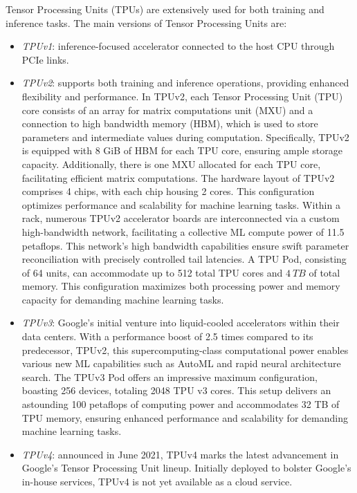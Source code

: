 Tensor Processing Units (TPUs) are extensively used for both training and inference tasks. 
The main versions of Tensor Processing Units are: 
\begin{itemize}
    \item \textit{TPUv1}: inference-focused accelerator connected to the host CPU through PCIe links. 
    \item \textit{TPUv2}: supports both training and inference operations, providing enhanced flexibility and performance.
        In TPUv2, each Tensor Processing Unit (TPU) core consists of an array for matrix computations unit (MXU) and a connection to high bandwidth memory (HBM), which is used to store parameters and intermediate values during computation.
        Specifically, TPUv2 is equipped with 8 GiB of HBM for each TPU core, ensuring ample storage capacity. 
        Additionally, there is one MXU allocated for each TPU core, facilitating efficient matrix computations.
        The hardware layout of TPUv2 comprises 4 chips, with each chip housing 2 cores. 
        This configuration optimizes performance and scalability for machine learning tasks.
        Within a rack, numerous TPUv2 accelerator boards are interconnected via a custom high-bandwidth network, facilitating a collective ML compute power of 11.5 petaflops. 
        This network's high bandwidth capabilities ensure swift parameter reconciliation with precisely controlled tail latencies.
        A TPU Pod, consisting of 64 units, can accommodate up to 512 total TPU cores and $4\:TB$ of total memory. 
        This configuration maximizes both processing power and memory capacity for demanding machine learning tasks.
    \item \textit{TPUv3}: Google's initial venture into liquid-cooled accelerators within their data centers. 
        With a performance boost of 2.5 times compared to its predecessor, TPUv2, this supercomputing-class computational power enables various new ML capabilities such as AutoML and rapid neural architecture search.
        The TPUv3 Pod offers an impressive maximum configuration, boasting 256 devices, totaling 2048 TPU v3 cores. 
        This setup delivers an astounding 100 petaflops of computing power and accommodates 32 TB of TPU memory, ensuring enhanced performance and scalability for demanding machine learning tasks.
    \item \textit{TPUv4}: announced in June 2021, TPUv4 marks the latest advancement in Google's Tensor Processing Unit lineup. 
        Initially deployed to bolster Google's in-house services, TPUv4 is not yet available as a cloud service.

\end{itemize}
